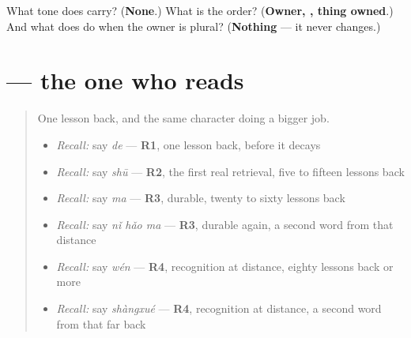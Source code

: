 \begin{tcolorbox}[breakable,colback=teal!4,colframe=teal!35!black,title={Before you move on}]
What tone does  carry? (\textbf{None}.) What is the order? (\textbf{Owner, , thing owned}.) And what does  do when the owner is plural? (\textbf{Nothing} — it never changes.)
\end{tcolorbox}
\section[\texorpdfstring{\zh{看书的人} (kàn shū de rén)}{看书的人 (kàn shū de rén)}]{ — the one who reads}

\label{lesson:ZH-C23-de-mingci}



\begin{quote}
One lesson back, and the same character doing a bigger job.

\begin{itemize}
\raggedright
  \item \emph{Recall:} say \emph{de} — \textbf{R1}, one lesson back, before it decays
  \item \emph{Recall:} say \emph{shū} — \textbf{R2}, the first real retrieval, five to fifteen lessons back
  \item \emph{Recall:} say \emph{ma} — \textbf{R3}, durable, twenty to sixty lessons back
  \item \emph{Recall:} say \emph{nǐ hǎo ma} — \textbf{R3}, durable again, a second word from that distance
  \item \emph{Recall:} say \emph{wén} — \textbf{R4}, recognition at distance, eighty lessons back or more
  \item \emph{Recall:} say \emph{shàngxué} — \textbf{R4}, recognition at distance, a second word from that far back
\end{itemize}
\end{quote}

